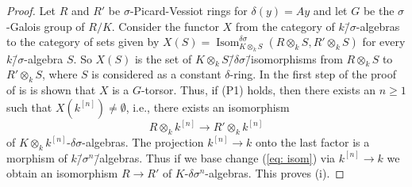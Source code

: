 \documentclass[oneside,reqno]{amsart}
\theoremstyle{definition}
\newcommand{\s}{\sigma}
\newcommand{\de}{\delta}
\newcommand{\ks}{$k$\=/$\s$}
\newcommand{\kn}{k^{[n]}}
\newcommand{\poweak}{{\rm{(P1)}}}
\begin{document}
\begin{proof}  
	Let $R$ and $R'$ be $\s$-Picard-Vessiot rings for $\de(y)=Ay$ and let $G$ be the $\s$-Galois group of $R/K$. Consider the functor $X$ from the category of \ks-algebras to the category of sets given by
	$X(S)=\operatorname{Isom}^{\delta\sigma}_{K\otimes_k S}(R\otimes_k S,R'\otimes_k S)$ for every \ks-algebra $S$. So $X(S)$ is the set of $K\otimes_k S$\=/$\delta\s$\=/isomorphisms from $R\otimes_k S$ to  $R'\otimes_k S$, where $S$ is considered as a constant $\de$-ring.
	In the first step of the proof of 	
	 \cite[Theorem 6.4]{BachmayrWibmer:TorsorsForDifferenceAlgebraicGroups} is is shown that $X$ is a $G$-torsor.
	 Thus, if \poweak{} holds, then there exists an $n\geq 1$ such that $X(\kn)\neq\emptyset$, i.e., there exists an isomorphism 
	 \begin{equation} \label{eq: isom}
	 R\otimes_k\kn\to R'\otimes_k\kn
	 \end{equation}
	 of $K\otimes_k\kn$-$\delta\s$-algebras. The projection $\kn\to k$ onto the last factor is a morphism of $k$\=/$\s^n$\=/algebras. Thus if we base change (\ref{eq: isom}) via $\kn\to k$ we obtain an isomorphism $R\to R'$ of $K$-$\de\s^n$-algebras. This proves (i).
	 

\end{proof}
\end{document}
